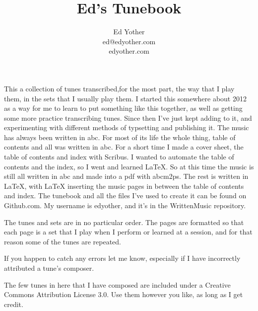 \documentclass[12pt,letterpaper]{article}
\begin{document}

\title{Ed's Tunebook}
\author{Ed Yother\\ed@edyother.com\\edyother.com}
\maketitle

This a collection of tunes transcribed,for the most part, the way that I play them, in the sets that I usually play them. I started this somewhere about 2012 as a way for me to learn to put something like this together, as well as getting some more practice transcribing tunes. Since then I've just kept adding to it, and experimenting with different methods of typsetting and publishing it. The music has always been written in abc. For most of its life the whole thing, table of contents and all was written in abc. For a short time I made a cover sheet, the table of contents and index with Scribus. I wanted to automate the table of contents and the index, so I went and learned LaTeX. So at this time the music is still all written in abc and made into a pdf with abcm2ps. The rest is written in LaTeX, with LaTeX inserting the music pages in between the table of contents and index. The tunebook and all the files I've used to create it can be found on Github.com. My username is edyother, and it's in the WrittenMusic repository. 

The tunes and sets are in no particular order. The pages are formatted so that each page is a set that I play when I perform or learned at a session, and for that reason some of the tunes are repeated.

If you happen to catch any errors let me know, especially if I have incorrectly attributed a tune's composer.

The few tunes in here that I have composed are included under a Creative Commons Attribution License 3.0. Use them however you like, as long as I get credit.

\pagebreak
\tableofcontents


\newpage



\setcounter{page}{1}

\end{document}
